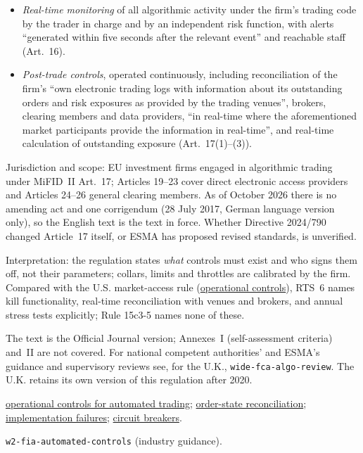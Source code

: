 \begin{qfrule}
\begin{itemize}
\item \emph{Real-time monitoring} of all algorithmic activity under the firm's trading code by the trader in charge and by an independent risk function, with alerts ``generated within five seconds after the relevant event'' and reachable staff (Art.~16).
\item \emph{Post-trade controls}, operated continuously, including reconciliation of the firm's ``own electronic trading logs with information about its outstanding orders and risk exposures as provided by the trading venues'', brokers, clearing members and data providers, ``in real-time where the aforementioned market participants provide the information in real-time'', and real-time calculation of outstanding exposure (Art.~17(1)--(3)).
\end{itemize}

 Jurisdiction and scope: EU investment firms engaged in algorithmic trading under MiFID~II Art.~17; Articles 19--23 cover direct electronic access providers and Articles 24--26 general clearing members. As of October 2026 there is no amending act and one corrigendum (28 July 2017, German language version only), so the English text is the text in force. Whether Directive 2024/790 changed Article~17 itself, or ESMA has proposed revised standards, is unverified.

 Interpretation: the regulation states \emph{what} controls must exist and who signs them off, not their parameters; collars, limits and throttles are calibrated by the firm. Compared with the U.S. market-access rule (\hyperref[meth:automated-trading-operational-controls]{operational controls}), RTS~6 names kill functionality, real-time reconciliation with venues and brokers, and annual stress tests explicitly; Rule 15c3-5 names none of these.

 The text is the Official Journal version; Annexes~I (self-assessment criteria) and~II are not covered. For national competent authorities' and ESMA's guidance and supervisory reviews see, for the U.K., \nolinkurl{wide-fca-algo-review}. The U.K. retains its own version of this regulation after 2020.

 \hyperref[meth:automated-trading-operational-controls]{operational controls for automated trading}; \hyperref[mech:order-state-reconciliation]{order-state reconciliation}; \hyperref[ev:quant-implementation-failures]{implementation failures}; \hyperref[mech:circuit-breakers-trading-halts]{circuit breakers}.

 \nolinkurl{w2-fia-automated-controls} (industry guidance).

\end{qfrule}

